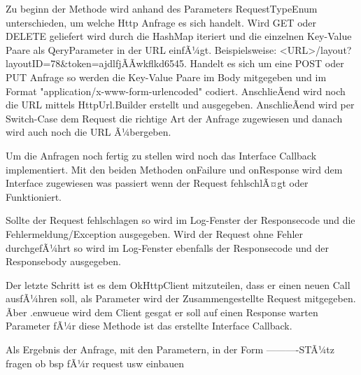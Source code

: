 Zu beginn der Methode wird anhand des Parameters RequestTypeEnum unterschieden, um welche Http Anfrage es sich handelt. Wird GET oder DELETE geliefert wird durch die HashMap iteriert und die einzelnen Key-Value Paare als QeryParameter in der URL einfÃ¼gt. Beispielsweise: <URL>/layout?layoutID=78&token=ajdlfjÃÃwkflkd6545.
Handelt es sich um eine POST oder PUT Anfrage so werden die Key-Value Paare im Body mitgegeben und im Format "application/x-www-form-urlencoded" codiert. AnschlieÃend wird noch die URL mittels HttpUrl.Builder erstellt und ausgegeben. 
AnschlieÃend wird per Switch-Case dem Request die richtige Art der Anfrage zugewiesen und danach wird auch noch die URL Ã¼bergeben. 

Um die Anfragen noch fertig zu stellen wird noch das Interface Callback implementiert. Mit den beiden Methoden onFailure und onResponse wird dem Interface zugewiesen was passiert wenn der Request fehlschlÃ¤gt oder Funktioniert. 

Sollte der Request fehlschlagen so wird im Log-Fenster der Responsecode und die Fehlermeldung/Exception ausgegeben. 
Wird der Request ohne Fehler durchgefÃ¼hrt so wird im Log-Fenster ebenfalls der Responsecode und der Responsebody ausgegeben.

Der letzte Schritt ist es dem OkHttpClient mitzuteilen, dass er einen neuen Call ausfÃ¼hren soll, als Parameter wird der Zusammengestellte Request mitgegeben. Ãber .enwueue wird dem Client gesgat er soll auf einen Response warten Parameter fÃ¼r diese Methode ist das erstellte Interface Callback.






Als Ergebnis der Anfrage, mit den Parametern, in der Form
----------STÃ¼tz fragen ob bsp fÃ¼r request usw einbauen



